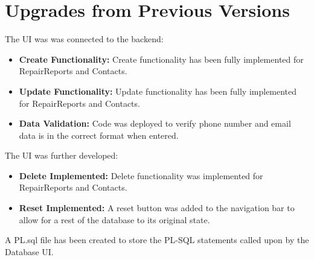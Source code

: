 \documentclass{article}
\begin{document}
\section{Upgrades from Previous Versions}

\vspace{0.2cm}
\begin{tcolorbox}[colback=secondarycolor, colframe=primarycolor, arc=5mm, title=\textbf{Step 4 --> Step 5}]
The UI was was connected to the backend:
\vspace{0.2cm}
\begin{itemize}
  \item \textbf{Create Functionality:} Create functionality has been fully implemented for RepairReports and Contacts.
  \vspace{0.1cm}
  \item \textbf{Update Functionality:} Update functionality has been fully implemented for RepairReports and Contacts.
  \vspace{0.1cm}
    \item \textbf{Data Validation:} Code was deployed to verify phone number and email data is in the correct format when entered.
  \vspace{0.1cm}
  \end{itemize}
\end{tcolorbox}

\vspace{1cm}
\begin{tcolorbox}[colback=secondarycolor, colframe=primarycolor, arc=5mm, title=\textbf{Step 3 --> Step 4}]
The UI was further developed:
\vspace{0.2cm}
\begin{itemize}
  \item \textbf{Delete Implemented:} Delete functionality was implemented for RepairReports and Contacts.
  \vspace{0.1cm}
  \item \textbf{Reset Implemented:} A reset button was added to the navigation bar to allow for a rest of the database to its original state.
  \vspace{0.1cm}
  \end{itemize}
\vspace{0.2cm}
A PL.sql file has been created to store the PL-SQL statements called upon by the Database UI.
\end{tcolorbox}
\end{document}
